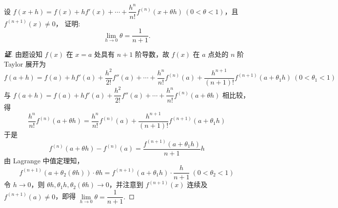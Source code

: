\begin{example}
    设 $f(x+h)=f(x)+hf'(x)+\cdots+\dfrac{h^n}{n!}f^{(n)}(x+\theta h)~ (0<\theta<1)$，且 $f^{(n+1)}(x)\neq 0$，
    证明: $$\lim\limits_{h\to0}\theta =\dfrac{1}{n+1}.$$
\end{example}
\begin{proof}[{\songti \textbf{证}}]
    由题设知 $f(x)$ 在 $x=a$ 处具有 $n+1$ 阶导数，故 $f(x)$ 在 $a$ 点处的 $n$ 阶 Taylor 展开为
    $$f\left( a+h\right) =f(a) +hf'(a) +\dfrac{h^{2}}{2!}f''(a) +\cdots +\dfrac{h^{n}}{n!}f^{(n) }(a) +\dfrac{h^{n+1}}{(n+1)  !}f^{(n+1)  }(a+\theta_1 h)~ (0<\theta_1<1)$$
    与 $f\left( a+h\right) =f(a) +hf'(a) +\dfrac{h^{2}}{2!}f''(a) +\cdots +\dfrac{h^{n}}{n!}f^{(n) }\left( a+\theta h\right) $ 相比较，得
    $$\dfrac{h^{n}}{n!}f^{(n) }\left( a+\theta h\right) =\dfrac{h^{n}}{n!}f^{(n) }(a) +\dfrac{h^{n+1}}{(n+1)  !}f^{(n+1)  }\left( a+\theta _{1}h\right) $$
    于是 $$f^{(n) }\left( a+\theta h\right) -f^{(n) }(a) =\dfrac{f^{(n+1)  }\left( a+\theta _{1}h\right) }{n+1}h$$
    由 Lagrange 中值定理知，
    $$f^{(n+1)  }\left( a+\theta _{2}\left( \theta h\right) \right) \cdot \theta h=f^{(n+1)  }\left( a+\theta _{1}h\right) \cdot \dfrac{h}{n+1}~ ( 0 <\theta _{2} < 1) $$
    令 $h\to0$，则 $\theta h,\theta_1 h,\theta_2(\theta h)\to0$，并注意到 $f^{(n+1)}(x)$ 连续及 $f^{(n+1)}(a)\neq 0$，即得 $\lim\limits_{h\to0}\theta =\dfrac{1}{n+1}.$
\end{proof}

